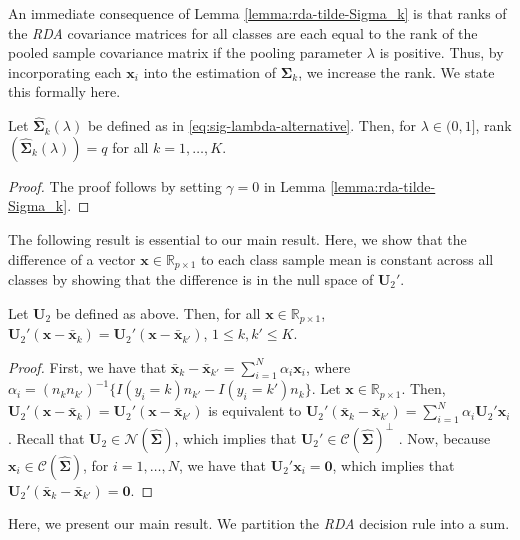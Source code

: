 \documentclass[11pt]{article}
\newcommand{\xbar}{\bar{\bm x}}
\begin{document}
An immediate consequence of Lemma \ref{lemma:rda-tilde-Sigma_k} is that ranks of the \emph{RDA} covariance matrices for all classes are each equal to the rank of the pooled sample covariance matrix if the pooling parameter $\lambda$ is positive. Thus, by incorporating each $\bm x_i$ into the estimation of $\bm \Sigma_k$, we increase the rank. We state this formally here.

\begin{cor}
Let $\widehat{\bm \Sigma}_k(\lambda)$ be defined as in \eqref{eq:sig-lambda-alternative}. Then, for $\lambda \in (0, 1]$, rank$(\widehat{\bm \Sigma}_k(\lambda)) = q$ for all $k = 1, \ldots, K$.
\end{cor}
\begin{proof}
The proof follows by setting $\gamma = 0$ in Lemma \ref{lemma:rda-tilde-Sigma_k}.
\end{proof}

The following result is essential to our main result. Here, we show that the difference of a vector $\bm x \in \mathbb{R}_{p \times 1}$ to each class sample mean is constant across all classes by showing that the difference is in the null space of $\bm U_2'$.

\begin{lemma}\label{lemma:RDA-constant-term}
Let $\bm U_2$ be defined as above. Then, for all $\bm x \in \mathbb{R}_{p \times 1}$, $\bm U_2' (\bm x - \xbar_k) = \bm U_2' (\bm x - \xbar_{k'})$, $1 \le k, k' \le K$.
\end{lemma}
\begin{proof}
	First, we have that $\xbar_k - \xbar_{k'} = \sum_{i=1}^N \alpha_i \bm x_i$, where $\alpha_i = (n_k n_{k'})^{-1} \{ I(y_i = k) n_{k'} - I(y_i = k') n_k \}$. Let $\bm x \in \mathbb{R}_{p \times 1}$. Then, $\bm U_2' (\bm x - \xbar_k) = \bm U_2' (\bm x - \xbar_{k'})$ is equivalent to $\bm U_2'(\xbar_k - \xbar_{k'}) = \sum_{i=1}^N \alpha_i \bm U_2' \bm x_i$. Recall that $\bm U_2 \in \mathcal{N}(\widehat{\bm \Sigma})$, which implies that $\bm U_2' \in \mathcal{C}(\widehat{\bm \Sigma})^{\perp}$ \citep[Lemma 1.2.5]{Kollo:2005vp}. Now, because $\bm x_i \in \mathcal{C}(\widehat{\bm \Sigma})$, for $i = 1, \ldots, N$, we have that $\bm U_2' \bm x_i = \bm 0$, which implies that $\bm U_2'(\xbar_k - \xbar_{k'}) = \bm 0$.
\end{proof}

Here, we present our main result. We partition the \emph{RDA} decision rule into a sum.
\end{document}
